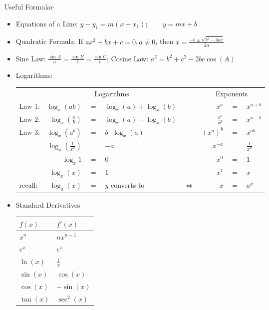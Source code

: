 \begin{center}\Large{Useful Formulae}
\end{center}
\begin{itemize}
	\item Equations of a Line: $y - y_1 = m(x - x_1);\qquad y=mx+b$
	\item Quadratic Formula:
	If $ax^2+bx+c=0$,\,$a\ne0$, then $\displaystyle x = \frac{-b\pm \sqrt{b^2-4ac}}{2a}$
	\item Sine Law: $\frac{\sin A}{a}= \frac{\sin B}{b}=\frac{\sin C}{c}$; \hspace{0.2cm}Cosine Law: $a^2=b^2+c^2-2bc\cos(A)$
	\item Logarithms:\\
	\begin{center}
		\renewcommand{\arraystretch}{1.2}
		\begin{tabular}{lrclcrcl}
			\toprule
			&\multicolumn{3}{c}{Logarithms}& &\multicolumn{3}{c}{Exponents}\\
			\cmidrule{1-4}\cmidrule{6-8}
			Law 1: &$ \log_x(ab) $&$=$&$ \log_x(a)+\log_x(b)  $&\hspace{1cm} &$x^a$&$=$&$x^{a+b} $\\
			Law 2: &$ \log_x\left(\frac{a}{b}\right) $&$=$&$  \log_x(a)-\log_x(b) $& &$\frac{x^a}{x^b}$&$=$&$x^{a-b}  $\\
			Law 3: &$ \log_x(a^b) $&$=$&$ b\cdot\log_x(a)   $& &$(x^a)^b $&$=$&$x^{ab} $\\
			\cmidrule{1-4}\cmidrule{6-8}
			&$  \log_{x}\left(\frac{1}{x^a}\right) $&$=$&$-a   $& &$x^{-a} $&$=$&$\frac{1}{x^a} $\\
			&$ \log_{x}1  $&$=$&$ 0  $& &$x^0 $&$=$&$1 $\\
			&$ \log_x(x) $&$=$&$  1 $& &$x^1 $&$=$&$x $\\
			\bottomrule
			recall:&$ \log_a(x) $&$=$&$y$\hspace{0.5cm} converts to& $\Leftrightarrow$ &$x $&$=$&$a^y $\\
			\bottomrule
		\end{tabular}
	\end{center}
	\item Standard Derivatives
	\renewcommand{\arraystretch}{1.1}
	\setlength{\tabcolsep}{1.5em}
	\begin{table}[h]\vspace{-0.6cm}
		\centering
		\begin{tabular}{ll}
			\hline
			$f(x)$ & $f'(x)$  \\ \hline
			$x^n$ & $nx^{n-1}$ \\ 
			$e^x$ & $e^x$  \\ 
			$\ln(x)$ & $\frac{1}{x}$ \\ 
			$\sin(x)$ & $\cos(x)$  \\ 
			$\cos(x)$ & $-\sin(x)$  \\ 
			$\tan(x)$ & $\sec^2(x)$  \\ \hline
		\end{tabular}
	\end{table}
	

\end{itemize}
